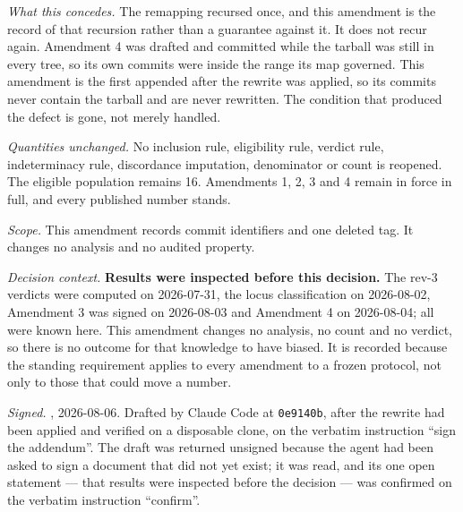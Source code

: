 \emph{What this concedes.} The remapping recursed once, and this amendment is the record of that recursion rather than a guarantee against it. It does not recur again. Amendment 4 was drafted and committed while the tarball was still in every tree, so its own commits were inside the range its map governed. This amendment is the first appended after the rewrite was applied, so its commits never contain the tarball and are never rewritten. The condition that produced the defect is gone, not merely handled.

\emph{Quantities unchanged.} No inclusion rule, eligibility rule, verdict rule, indeterminacy rule, discordance imputation, denominator or count is reopened. The eligible population remains 16. Amendments 1, 2, 3 and 4 remain in force in full, and every published number stands.

\emph{Scope.} This amendment records commit identifiers and one deleted tag. It changes no analysis and no audited property.

\emph{Decision context.} \textbf{Results were inspected before this decision.} The rev-3 verdicts were computed on 2026-07-31, the locus classification on 2026-08-02, Amendment 3 was signed on 2026-08-03 and Amendment 4 on 2026-08-04; all were known here. This amendment changes no analysis, no count and no verdict, so there is no outcome for that knowledge to have biased. It is recorded because the standing requirement applies to every amendment to a frozen protocol, not only to those that could move a number.

\emph{Signed.} \authorname{}, 2026-08-06. Drafted by Claude Code at \texttt{0e9140b}, after the rewrite had been applied and verified on a disposable clone, on the verbatim instruction ``sign the addendum''. The draft was returned unsigned because the agent had been asked to sign a document that did not yet exist; it was read, and its one open statement --- that results were inspected before the decision --- was confirmed on the verbatim instruction ``confirm''.
